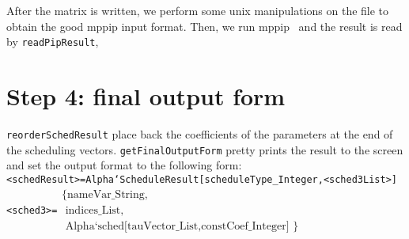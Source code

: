 After the matrix is written, we perform some unix manipulations on the
file to obtain the good mppip input format. Then, we run 
mppip~\cite{Feautrier92aa}  and
the result is read by {\tt readPipResult}, 

\section{Step 4: final output form}
{\tt reorderSchedResult} place back the coefficients of the parameters
at the end of the scheduling vectors.
 {\tt getFinalOutputForm} pretty prints the result to the screen and 
set the output format to the following form: \\
{\tt <schedResult>=Alpha`ScheduleResult[scheduleType\_Integer,<sched3List>]\\
<sched3>=$\begin{array}{l} \mbox{\{ nameVar\_String,}\\
          \mbox{ indices\_List,}\\
           \mbox{ Alpha`sched[tauVector\_List,constCoef\_Integer] \}}
\end{array}$
}

 



